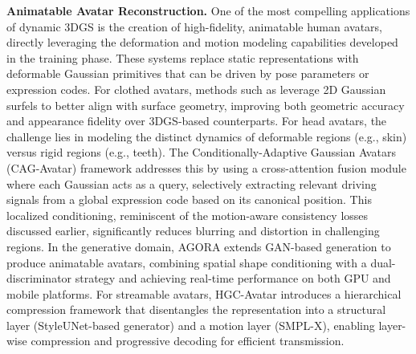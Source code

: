 \documentclass[11pt]{article}
\begin{document}
\textbf{Animatable Avatar Reconstruction.} One of the most compelling applications of dynamic 3DGS is the creation of high-fidelity, animatable human avatars, directly leveraging the deformation and motion modeling capabilities developed in the training phase. These systems replace static representations with deformable Gaussian primitives that can be driven by pose parameters or expression codes. For clothed avatars, methods such as \cite{ref397} leverage 2D Gaussian surfels to better align with surface geometry, improving both geometric accuracy and appearance fidelity over 3DGS-based counterparts. For head avatars, the challenge lies in modeling the distinct dynamics of deformable regions (e.g., skin) versus rigid regions (e.g., teeth). The Conditionally-Adaptive Gaussian Avatars (CAG-Avatar) framework \cite{ref398} addresses this by using a cross-attention fusion module where each Gaussian acts as a query, selectively extracting relevant driving signals from a global expression code based on its canonical position. This localized conditioning, reminiscent of the motion-aware consistency losses discussed earlier, significantly reduces blurring and distortion in challenging regions. In the generative domain, AGORA \cite{ref399} extends GAN-based generation to produce animatable avatars, combining spatial shape conditioning with a dual-discriminator strategy and achieving real-time performance on both GPU and mobile platforms. For streamable avatars, HGC-Avatar \cite{ref400} introduces a hierarchical compression framework that disentangles the representation into a structural layer (StyleUNet-based generator) and a motion layer (SMPL-X), enabling layer-wise compression and progressive decoding for efficient transmission.
\end{document}
